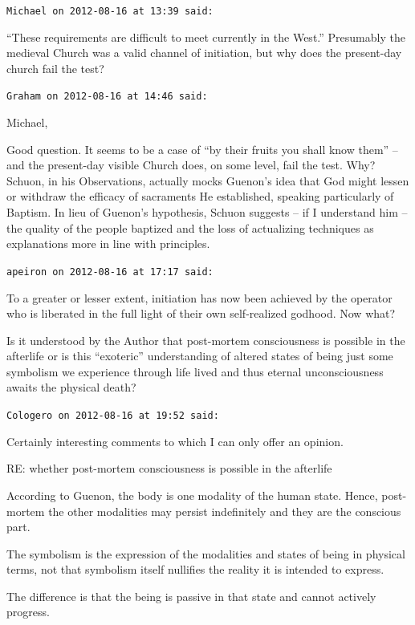\begin{footnotesize}
\begin{sffamily}
\hfill

\texttt{Michael on 2012-08-16 at 13:39 said:}

``These requirements are difficult to meet currently in the West.'' Presumably the medieval Church was a valid channel of initiation, but why does the present-day church fail the test?

\hfill

\texttt{Graham on 2012-08-16 at 14:46 said:}

Michael,

Good question. It seems to be a case of ``by their fruits you shall know them'' -- and the present-day visible Church does, on some level, fail the test. Why? Schuon, in his Observations, actually mocks Guenon's idea that God might lessen or withdraw the efficacy of sacraments He established, speaking particularly of Baptism. In lieu of Guenon's hypothesis, Schuon suggests -- if I understand him -- the quality of the people baptized and the loss of actualizing techniques as explanations more in line with principles.

\hfill

\texttt{apeiron on 2012-08-16 at 17:17 said:}

To a greater or lesser extent, initiation has now been achieved by the operator who is liberated in the full light of their own self-realized godhood. Now what?

Is it understood by the Author that post-mortem consciousness is possible in the afterlife or is this ``exoteric'' understanding of altered states of being just some symbolism we experience through life lived and thus eternal unconsciousness awaits the physical death?

\hfill

\texttt{Cologero on 2012-08-16 at 19:52 said:}

Certainly interesting comments to which I can only offer an opinion.

RE: whether post-mortem consciousness is possible in the afterlife

According to Guenon, the body is one modality of the human state. Hence, post-mortem the other modalities may persist indefinitely and they are the conscious part.

The symbolism is the expression of the modalities and states of being in physical terms, not that symbolism itself nullifies the reality it is intended to express.

The difference is that the being is passive in that state and cannot actively progress.


\end{sffamily}
\end{footnotesize}
